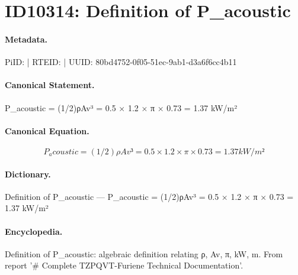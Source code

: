 \section*{ID10314: Definition of P\_acoustic}
\paragraph{Metadata.}
PiID:  | RTEID:  | UUID: 80bd4752-0f05-51ec-9ab1-d3a6f6cc4b11

\paragraph{Canonical Statement.}
P\_acoustic = (1/2)ρAv³ = 0.5 × 1.2 × π × 0.73 = 1.37 kW/m²

\paragraph{Canonical Equation.}
\[
P_acoustic = (1/2)ρAv³ = 0.5 × 1.2 × π × 0.73 = 1.37 kW/m²
\]

\paragraph{Dictionary.}
Definition of P\_acoustic — P\_acoustic = (1/2)ρAv³ = 0.5 × 1.2 × π × 0.73 = 1.37 kW/m²

\paragraph{Encyclopedia.}
Definition of P\_acoustic: algebraic definition relating ρ, Av, π, kW, m. From report '\# Complete TZPQVT-Furiene Technical Documentation'.
